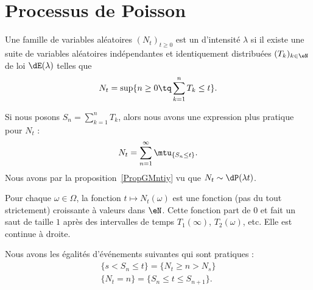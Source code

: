 
\section{Processus de Poisson}
\label{SecHxbtzQ}

\begin{definition}      \label{DEFooWXHEooEHQUJU}
	Une famille de variables aléatoires \( (N_t)_{t\geq 0}\) est un  d'intensité \( \lambda\) si il existe une suite de variables aléatoires indépendantes et identiquement distribuées \( (T_k)_{k\in \eN}\) de loi \( \dE(\lambda)\) telles que
	\begin{equation}
		N_t=\sup\{ n\geq 0\tq \sum_{k=1}^nT_k\leq t \}.
	\end{equation}
\end{definition}
Si nous posons \( S_n=\sum_{k=1}^nT_k\), alors nous avons une expression plus pratique pour \( N_t\) :
\begin{equation}
	N_t=\sum_{n=1}^{\infty}\mtu_{\{ S_n\leq t \}}.
\end{equation}
Nous avons par la proposition~\ref{PropGMntiy} vu que \( N_t\sim\dP(\lambda t)\).


Pour chaque \( \omega\in \Omega\), la fonction \( t\mapsto N_t(\omega)\) est une fonction (pas du tout strictement) croissante à valeurs dans \( \eN\). Cette fonction part de \( 0\) et fait un saut de taille \( 1\) après des intervalles de temps \( T_1(\infty)\), \( T_2(\omega)\), etc. Elle est continue à droite.

Nous avons les égalités d'événements suivantes qui sont pratiques :
\begin{subequations}
	\begin{align}
		\{ s<S_n\leq t \}=\{ N_t\geq n>N_s \} \\
		\{ N_t=n \}=\{ S_n\leq t\leq S_{n+1} \}.
	\end{align}
\end{subequations}

